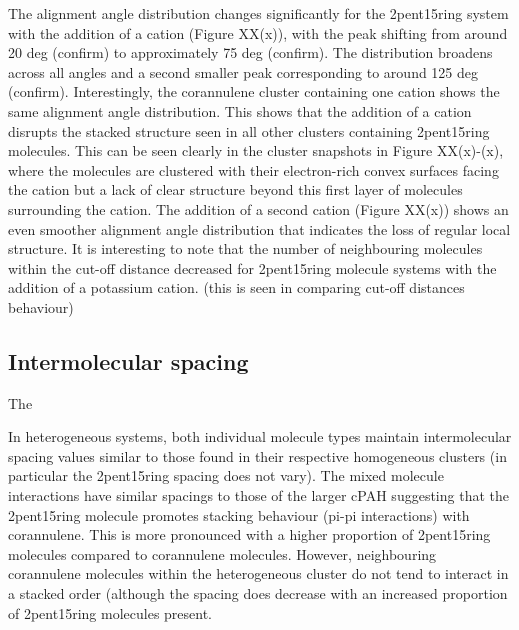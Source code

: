 The alignment angle distribution changes significantly for the 2pent15ring system with the addition of a cation (Figure XX(x)), with the peak shifting from around 20 deg (confirm) to approximately 75 deg (confirm). The distribution broadens across all angles and a second smaller peak corresponding to around 125 deg (confirm).
Interestingly, the corannulene cluster containing one cation shows the same alignment angle distribution.  This shows that the addition of a cation disrupts the stacked structure seen in all other clusters containing 2pent15ring molecules. This can be seen clearly in the cluster snapshots in Figure XX(x)-(x), where the molecules are clustered with their electron-rich convex surfaces facing the cation but a lack of clear structure beyond this first layer of molecules surrounding the cation.
The addition of a second cation (Figure XX(x)) shows an even smoother alignment angle distribution that indicates the loss of regular local structure.
It is interesting to note that the number of neighbouring molecules within the cut-off distance decreased for 2pent15ring molecule systems with the addition of a potassium cation. (this is seen in comparing cut-off distances behaviour)


\subsection{Intermolecular spacing}
The 

In heterogeneous systems, both individual molecule types maintain intermolecular spacing values similar to those found in their respective homogeneous clusters (in particular the 2pent15ring spacing does not vary). The mixed molecule interactions have similar spacings to those of the larger cPAH suggesting that the 2pent15ring molecule promotes stacking behaviour (pi-pi interactions) with corannulene.  This is more pronounced with a higher proportion of 2pent15ring molecules compared to corannulene molecules. However, neighbouring corannulene molecules within the heterogeneous cluster do not tend to interact in a stacked order (although the spacing does decrease with an increased proportion of 2pent15ring molecules present.

